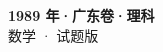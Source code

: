 \documentclass[zihao=-4, a4paper]{ctexart}
\begin{document}
\begin{center}
  {\Large\bfseries 1989 年·广东卷·理科}\\[4pt]
  {\large 数学 · 试题版}
\end{center}
\medskip
{}

\end{document}
